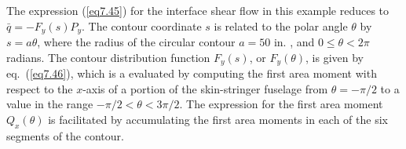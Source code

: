 \documentclass{AeroStructure-ERJohnson}
\begin{document}
\begin{example}
{\def\thefigure{7.20}
}




The expression (\ref{eq7.45}) for the interface shear flow in this example reduces to $\bar{q}=-F_{y}(s) P_{y}$. The contour coordinate $s$ is related to the polar angle $\theta$ by $s=a \theta$, where the radius of the circular contour $a=50 \text { in. }$, and $0 \leq \theta<2 \pi$ radians. The contour distribution function $F_{y}(s)$, or $F_{y}(\theta)$, is given by eq.~(\ref{eq7.46}), which is a evaluated by computing the first area moment with respect to the $x$-axis of a portion of the skin-stringer fuselage from $\theta=-\pi / 2$ to a value in the range $-\pi / 2<\theta<3 \pi / 2$. The expression for the first area moment $Q_{x}(\theta)$ is facilitated by accumulating the first area moments in each of the six segments of the contour\vadjust{\vspace*{6pt}\pagebreak}.


\end{example}
\end{document}
